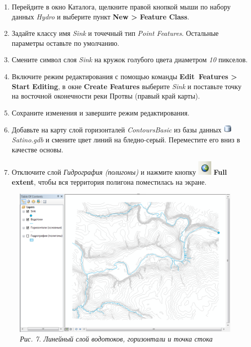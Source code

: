 \documentclass[]{book}
\theoremstyle{definition}
\theoremstyle{definition}
\theoremstyle{definition}
\theoremstyle{remark}
\begin{document}
\begin{enumerate}
\def\labelenumi{\arabic{enumi}.}
\item
  Перейдите в окно Каталога, щелкните правой кнопкой мыши по набору
  данных \emph{Hydro} и выберите пункт \textbf{New \textgreater{}
  Feature Class}.
\item
  Задайте классу имя \emph{Sink} и точечный тип \emph{Point Features}.
  Остальные параметры оставьте по умолчанию.
\item
  Смените символ слоя \emph{Sink} на кружок голубого цвета диаметром
  \emph{10} пикселов.
\item
  Включите режим редактирования с помощью команды \textbf{Edit~Features
  \textgreater{} Start Editing}, в окне \textbf{Create Features}
  выберите \emph{Sink} и поставьте точку на восточной оконечности реки
  Протвы (правый край карты).
\item
  Сохраните изменения и завершите режим редактирования.
\item
  Добавьте на карту слой горизонталей \emph{ContoursBasic} из базы
  данных \includegraphics{images/Ex13/image5.png} \emph{Satino.gdb} и
  смените цвет линий на бледно-серый. Переместите его вниз в качестве
  основы.
\item
  Отключите слой \emph{Гидрография (полигоны)} и нажмите кнопку
  \includegraphics{images/Ex13/image14.png} \textbf{Full extent}, чтобы
  вся территория полигона поместилась на экране.
\end{enumerate}

\begin{figure}
\centering
\includegraphics{images/Ex13/image19.png}
\caption{\emph{Рис. 7. Линейный слой водотоков, горизонтали и точка
стока}}
\end{figure}
\end{document}

